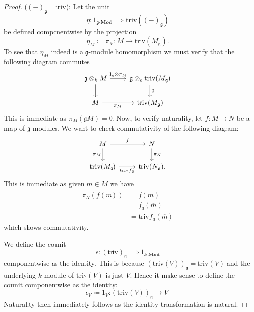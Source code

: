 \begin{proof}
  ($ (-)_{\mathfrak{g}} \dashv \text{triv} $): Let the unit
  \begin{equation}
    \eta: 1_{\mathfrak{g}\text{-}\mathbf{Mod}} \implies \text{triv}((-)_\mathfrak{g})
  \end{equation}
  be defined componentwise by the projection
  \begin{equation}
    \eta_M \coloneqq \pi_M : M \to \text{triv}(M_\mathfrak{g}).
  \end{equation}
  To see that $ \eta_M $ indeed is a $ \mathfrak{g} $-module homomorphism we must verify that the following diagram commutes
  \[\begin{tikzcd}
	  {\mathfrak{g} \otimes_kM} & {\mathfrak{g}\otimes_k\text{triv}(M_\mathfrak{g})} \\
	  M & {\text{triv}(M_\mathfrak{g})}
	  \arrow["0", from=1-2, to=2-2]
	  \arrow["{1_\mathfrak{g} \otimes \pi_M}", from=1-1, to=1-2]
	  \arrow[from=1-1, to=2-1]
	  \arrow["{\pi_M}"', from=2-1, to=2-2]
  \end{tikzcd}\]
  This is immediate as $ \pi_M(\mathfrak{g}M) = 0 $. Now, to verify naturality, let $ f: M \to N $ be a map of $ \mathfrak{g} $-modules. We want to check commutativity of the following diagram:
  \[\begin{tikzcd}
	  M & N \\
	  {\text{triv}(M_\mathfrak{g})} & {\text{triv}(N_\mathfrak{g}).}
	  \arrow["{\pi_M}"', from=1-1, to=2-1]
	  \arrow["f", from=1-1, to=1-2]
	  \arrow["{\text{triv}f_\mathfrak{g}}"', from=2-1, to=2-2]
	  \arrow["{\pi_N}", from=1-2, to=2-2]
  \end{tikzcd}\]
  This is immediate as given $ m \in M $ we have
  \begin{align*}
    \pi_N(f(m)) &= \overline{f(m)} \\
                &= f_\mathfrak{g}(\overline{m}) \\
                &= \text{triv}f_\mathfrak{g}(\overline{m})
  \end{align*}
  which shows commutativity.

  We define the counit
  \begin{equation}
    \epsilon:(\text{triv})_\mathfrak{g} \implies 1_{k\text{-}\mathbf{Mod}}
  \end{equation}
  componentwise as the identity. This is because $ (\text{triv}(V))_\mathfrak{g}=\text{triv}(V) $ and the underlying $ k $-module of $ \text{triv}(V) $ is just $ V $. Hence it make sense to define the counit componentwise as the identity:
  \begin{equation}
    \epsilon_V \coloneqq 1_V:(\text{triv}(V))_\mathfrak{g} \to V.
  \end{equation}
  Naturality then immediately follows as the identity transformation is natural.


\end{proof}
